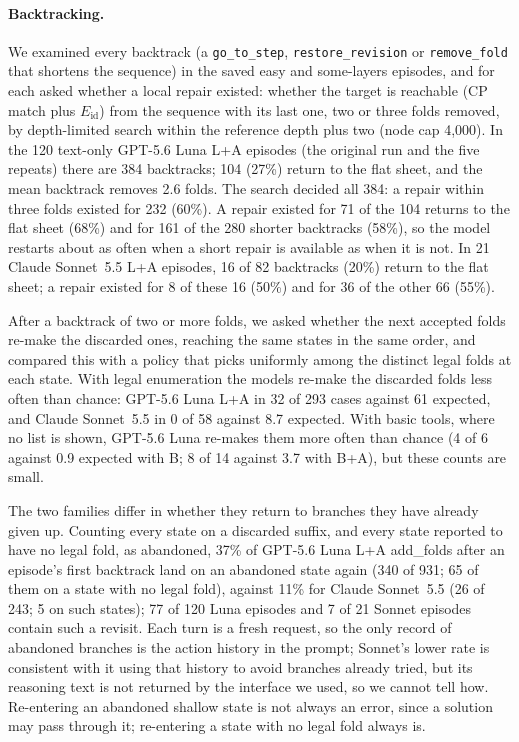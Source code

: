 \paragraph{Backtracking.} We examined every backtrack (a \texttt{go\_to\_step},
\texttt{restore\_revision} or \texttt{remove\_fold} that shortens the sequence) in the saved easy and
some-layers episodes, and for each asked whether a local repair existed: whether the target is
reachable (CP match plus $E_{\mathrm{id}}$) from the sequence with its last one, two or three folds
removed, by depth-limited search within the reference depth plus two (node cap 4,000). In the
120 text-only GPT-5.6 Luna L+A episodes (the original run and the five repeats) there are 384
backtracks; 104 (27\%) return to the flat sheet, and the mean backtrack removes 2.6 folds. The
search decided all 384: a repair within three folds existed for 232 (60\%). A repair existed for
71 of the 104 returns to the flat sheet (68\%) and for 161 of the 280 shorter backtracks (58\%), so
the model restarts about as often when a short repair is available as when it is not. In 21 Claude
Sonnet~5.5 L+A episodes, 16 of 82 backtracks (20\%) return to the flat sheet; a repair existed for
8 of these 16 (50\%) and for 36 of the other 66 (55\%).

After a backtrack of two or more folds, we asked whether the next accepted folds re-make the
discarded ones, reaching the same states in the same order, and compared this with a policy that
picks uniformly among the distinct legal folds at each state. With legal enumeration the models
re-make the discarded folds less often than chance: GPT-5.6 Luna L+A in 32 of 293 cases against
61 expected, and Claude Sonnet~5.5 in 0 of 58 against 8.7 expected. With basic tools, where no
list is shown, GPT-5.6 Luna re-makes them more often than chance (4 of 6 against 0.9 expected with
B; 8 of 14 against 3.7 with B+A), but these counts are small.

The two families differ in whether they return to branches they have already given up. Counting
every state on a discarded suffix, and every state reported to have no legal fold, as abandoned,
37\% of GPT-5.6 Luna L+A add\_folds after an episode's first backtrack land on an abandoned state
again (340 of 931; 65 of them on a state with no legal fold), against 11\% for Claude Sonnet~5.5
(26 of 243; 5 on such states); 77 of 120 Luna episodes and 7 of 21 Sonnet episodes contain such a
revisit. Each turn is a fresh request, so the only record of abandoned branches is the action
history in the prompt; Sonnet's lower rate is consistent with it using that history to avoid
branches already tried, but its reasoning text is not returned by the interface we used, so we
cannot tell how. Re-entering an abandoned shallow state is not always an error, since a solution
may pass through it; re-entering a state with no legal fold always is.

